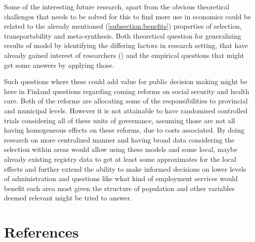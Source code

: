 \documentclass[main=english,12pt,a4paper,pdftex,econ,utf8]{aaltothesis}
\begin{document}
Some of the interesting future research, apart from the obvious theoretical challenges that needs to be solved for this to find more use in economics could be related to the already mentioned (\ref{subsection:benefits}) properties of selection, transportability and meta-synthesis. Both theoretical question for generalizing results of model by identifying the differing factors in research setting, that have already gained interest of researchers (\cite{Cinelli2021}) and the empirical questions that might get some answers by applying those.

Such questions where these could add value for public decision making might be here in Finland questions regarding coming reforms on social security and health care. Both of the reforms are allocating some of the responsibilities to provincial and municipal levels. However it is not attainable to have randomised controlled trials considering all of these units of governance, assuming those are not all having homogeneous effects on these reforms, due to costs associated. By doing research on more centralized manner and having broad data considering the selection within areas would allow using these models and some local, maybe already existing registry data to get at least some approximates for the local effects and further extend the ability to make informed decisions on lower levels of administration and questions like what kind of employment services would benefit each area most given the structure of population and other variables deemed relevant might be tried to answer.

\clearpage

\section*{References}
\printbibliography[
    heading=subbibintoc,
    type=article,
    title={Articles \& seminar papers}
]
\printbibliography[
    heading=subbibintoc,
    type=book,
    title={Books}
]
\printbibliography[
    heading=subbibintoc,
    type=misc,
    title={Other sources}
]

\clearpage
\end{document}
